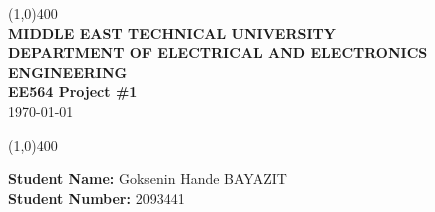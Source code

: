 \documentclass[oneside,12pt]{article}
\begin{document}
\vfill
\begin{titlepage}
\begin{center}
\line(1,0){400}\\
\vspace{2cm}
\LARGE\textbf{MIDDLE EAST TECHNICAL UNIVERSITY}\\
\vspace{0.5cm}
\LARGE\textbf{DEPARTMENT OF ELECTRICAL AND ELECTRONICS ENGINEERING}\\ 

\vspace{1.5cm}
\LARGE\textbf{EE564 Project \#1}\\
\vspace{0.5cm}
\today\\
\vspace{2cm}

\line(1,0){400}\\
\vspace{0.5cm}

\end{center}

\vspace{3cm}
\begin{flushleft}
\LARGE\textbf {Student Name:} Goksenin Hande BAYAZIT\\
\LARGE\textbf {Student Number:} 2093441\\
\end{flushleft}
\end{titlepage}
\newpage
{}


\end{document}
